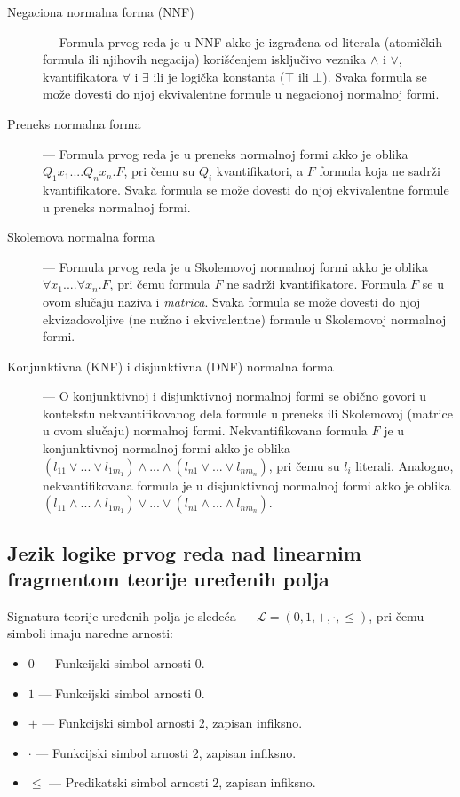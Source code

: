 \documentclass[a4paper,10pt]{article}
\begin{document}
\begin{description}
    \item[Negaciona normalna forma (NNF)] --- Formula prvog reda je u NNF akko je izgrađena od literala (atomičkih formula ili njihovih negacija) korišćenjem isključivo veznika $\land$ i $\lor$, kvantifikatora $\forall$ i $\exists$ ili je logička konstanta ($\top$ ili $\bot$). Svaka formula se može dovesti do njoj ekvivalentne formule u negacionoj normalnoj formi.
    \item[Preneks normalna forma] --- Formula prvog reda je u preneks normalnoj formi akko je oblika $Q_1x_1. ... Q_nx_n.F$, pri čemu su $Q_i$ kvantifikatori, a $F$ formula koja ne sadrži kvantifikatore. Svaka formula se može dovesti do njoj ekvivalentne formule u preneks normalnoj formi.
    \item[Skolemova normalna forma] --- Formula prvog reda je u Skolemovoj normalnoj formi akko je oblika $\forall x_1. ... \forall x_n.F$, pri čemu formula $F$ ne sadrži kvantifikatore. Formula $F$ se u ovom slučaju naziva i \textit{matrica}. Svaka formula se može dovesti do njoj ekvizadovoljive (ne nužno i ekvivalentne) formule u Skolemovoj normalnoj formi.
    \item[Konjunktivna (KNF) i disjunktivna (DNF) normalna forma] --- O konjunktivnoj i disjunktivnoj normalnoj formi se obično govori u kontekstu nekvantifikovanog dela formule u preneks ili Skolemovoj (matrice u ovom slučaju) normalnoj formi. Nekvantifikovana formula $F$ je u konjunktivnoj normalnoj formi akko je oblika $(l_{11} \lor ... \lor l_{1m_1}) \land ... \land (l_{n1} \lor ... \lor l_{nm_n})$, pri čemu su $l_i$ literali. Analogno, nekvantifikovana formula je u disjunktivnoj normalnoj formi akko je oblika $(l_{11} \land ... \land l_{1m_1}) \lor ... \lor (l_{n1} \land ... \land l_{nm_n})$.
\end{description}

\subsection{Jezik logike prvog reda nad linearnim fragmentom teorije uređenih polja}
\label{subsec:teorija_uredjenih_polja}

Signatura teorije uređenih polja je sledeća --- $\mathcal{L} = (0, 1, +, \cdot, \leq)$, pri čemu simboli imaju naredne arnosti:
\begin{itemize}
    \item $0$ --- Funkcijski simbol arnosti $0$.
    \item $1$ --- Funkcijski simbol arnosti $0$.
    \item $+$ --- Funkcijski simbol arnosti $2$, zapisan infiksno.
    \item $\cdot$ --- Funkcijski simbol arnosti $2$, zapisan infiksno.
    \item $\leq$ --- Predikatski simbol arnosti $2$, zapisan infiksno.
\end{itemize}
\end{document}
